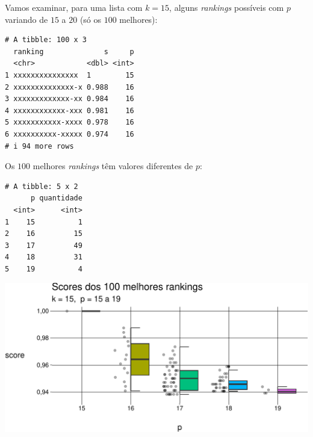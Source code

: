\documentclass[
  letterpaper,
  DIV=11,
  numbers=noendperiod]{scrreprt}
\begin{document}
Vamos examinar, para uma lista com $k = 15$, alguns \emph{rankings}
possíveis com $p$ variando de $15$ a $20$ (só os $100$ melhores):

\begin{verbatim}
# A tibble: 100 x 3
  ranking              s     p
  <chr>            <dbl> <int>
1 xxxxxxxxxxxxxxx  1        15
2 xxxxxxxxxxxxxx-x 0.988    16
3 xxxxxxxxxxxxx-xx 0.984    16
4 xxxxxxxxxxxx-xxx 0.981    16
5 xxxxxxxxxxx-xxxx 0.978    16
6 xxxxxxxxxx-xxxxx 0.974    16
# i 94 more rows
\end{verbatim}

Os $100$ melhores \emph{rankings} têm valores diferentes de $p$:

\begin{verbatim}
# A tibble: 5 x 2
      p quantidade
  <int>      <int>
1    15          1
2    16         15
3    17         49
4    18         31
5    19          4
\end{verbatim}

\begin{center}
\includegraphics[width=1\textwidth,height=\textheight]{usando-posicoes_files/figure-pdf/unnamed-chunk-7-1.pdf}
\end{center}
\end{document}
